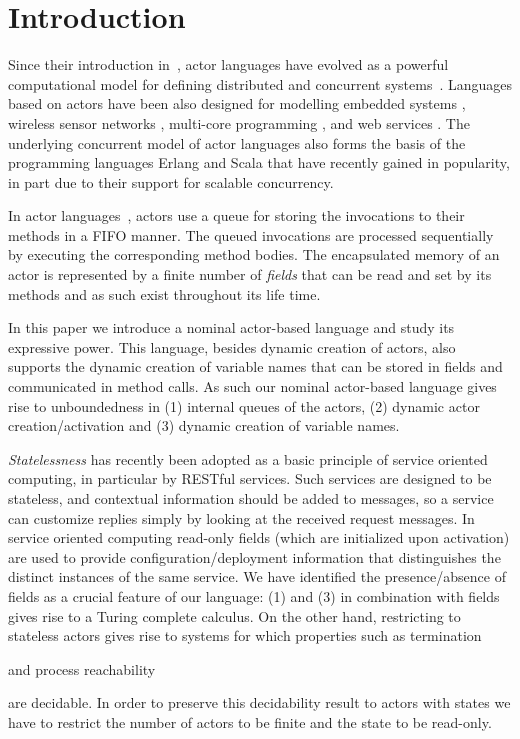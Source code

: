 \documentclass{LMCS}
\theoremstyle{plain}\newtheorem{proposition}[thm]{Proposition}
\theoremstyle{plain}\newtheorem{lemma}[thm]{Lemma}
\theoremstyle{plain}\newtheorem{theorem}[thm]{Theorem}
\theoremstyle{plain}\newtheorem{corollary}[thm]{Corollary}
\newif\ifconf \conffalse
\newif\ifcamera \camerafalse
\begin{document}
\ifcamera
\else
\pagestyle{plain}
\fi



\section{Introduction}

Since their introduction in~\cite{Hewitt69}, actor languages have  evolved as a powerful computational model for defining distributed and concurrent
systems~\cite{Agha90,Agha97}. 
Languages based on actors have been also designed for modelling embedded systems \cite{LeeLN09,LeeACtorEmbedded03}, 
wireless sensor networks \cite{CheongSensor05,RazaviBSKSS10}, multi-core programming \cite{KarmaniSA09}, and web services \cite{Chang-web-sac2007,Chang-DAIS07}.
The underlying concurrent model of actor languages also forms the basis of the   programming languages
Erlang \cite{Armstrong10Erlang} and Scala \cite{haller09tcs} that have recently gained in popularity, in part due to their support for scalable concurrency.

In actor languages~\cite{Agha90,Hewitt69,Sirjani06}, actors use a queue
for storing the invocations to their methods in a FIFO manner. The queued invocations
are processed sequentially by executing the corresponding method bodies.
The encapsulated memory of an actor is represented by a finite number of \emph{fields}
that can be read and set by its methods
and as such exist throughout  its life time.

In this paper we introduce a nominal actor-based language and study its expressive power. This language,  besides dynamic creation of actors, also supports
the dynamic creation of variable names that can be stored in fields and 
communicated in method calls.
As such our nominal actor-based language gives rise to unboundedness in
(1) internal queues of the actors, (2) dynamic actor creation/activation and (3) dynamic creation of variable names.

\emph{Statelessness} has recently been adopted as a basic principle 
of service oriented computing, in particular by RESTful services. 
Such services are designed to be stateless, and contextual information should be added to messages, so a service can customize replies simply by looking at the received request messages. 
In service oriented computing read-only fields (which are initialized upon activation)  are used to provide configuration/deployment information that distinguishes the distinct instances of the same service.
We have identified the presence/absence of fields as a crucial  feature
of our language:
 (1) and (3) in combination with fields gives rise to a Turing complete calculus.
On the other hand, restricting to stateless actors gives rise to systems for which properties such as termination 
\ifconf
\else
and process reachability 
\fi
are decidable. In order to preserve this decidability
result to actors with states we have to restrict the number of actors to be finite and the state to be read-only.
\end{document}
